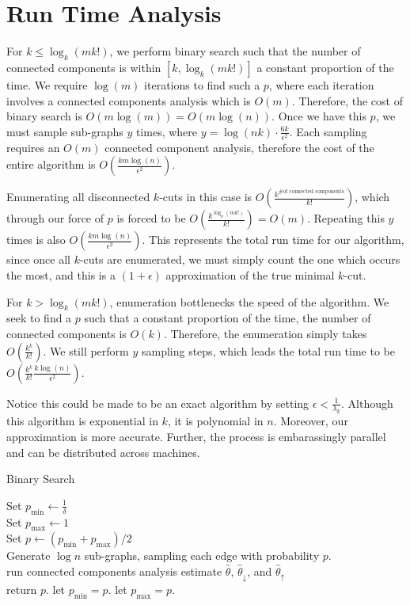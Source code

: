 \documentclass[12pt]{article}
\begin{document}
\section{Run Time Analysis}

For $k \leq \log_k(mk!)$, we perform binary search such that the number of connected components is within $[k, \log_k(mk!)]$ a constant proportion of the time. We require $\log(m)$ iterations to find such a $p$, where each iteration involves a connected components analysis which is $O(m)$. Therefore, the cost of binary search is $O(m \log(m)) = O(m \log(n))$. Once we have this $p$, we must sample sub-graphs $y$ times, where $y = \log(nk) \cdot \frac{6k}{\epsilon^2}$. Each sampling requires an $O(m)$ connected component analysis, therefore the cost of the entire algorithm is $O(\frac{km \log(n)}{\epsilon^2})$.

Enumerating all disconnected $k$-cuts in this case is $O(\frac{k^{\text{\# of connected components}}}{k!})$, which through our force of $p$ is forced to be $O(\frac{k^{\log_k(mk!)}}{k!}) = O(m)$. Repeating this $y$ times is also $O(\frac{km \log(n)}{\epsilon^2})$. This represents the total run time for our algorithm, since once all $k$-cuts are enumerated, we must simply count the one which occurs the most, and this is a $(1+\epsilon)$ approximation of the true minimal $k$-cut.

For $k > \log_k(mk!)$, enumeration bottlenecks the speed of the algorithm. We seek to find a $p$ such that a constant proportion of the time, the number of connected components is $O(k)$. Therefore, the enumeration simply takes $O(\frac{k^k}{k!})$. We still perform $y$ sampling steps, which leads the total run time to be $O(\frac{k^k}{k!} \frac{k \log(n)}{\epsilon^2})$.

Notice this could be made to be an exact algorithm by setting $\epsilon < \frac{1}{\lambda_k}$. Although this algorithm is exponential in $k$, it is polynomial in $n$. Moreover, our approximation is more accurate. Further, the process is embarassingly parallel and can be distributed across machines.

\LinesNumbered
\begin{algorithm}[H]
\caption{Binary Search}
Set $p_{\text{min}} \leftarrow \frac{1}{\delta}$ \\
Set $p_{\text{max}} \leftarrow 1$ \\
 {
  Set $p \leftarrow (p_{\text{min}} + p_{\text{max}})/2$ \\
  Generate $\log n$ sub-graphs, sampling each edge with probability   $p$. \\
   {
    run connected components analysis
  }
  estimate $\hat{\theta}$, $\hat{\theta}_{\downarrow}$, and $\hat{\theta}_{\uparrow}$ \\
   {
    return $p$.
  }
  \uElseIf{$\hat{\theta}_{\downarrow} > \hat{\theta}_{\uparrow}$} {
    let $p_{\text{min}} = p$.
  }
  \ElseIf{$\hat{\theta}_{\uparrow} > \hat{\theta}_{\downarrow}$} {
    let $p_{\text{max}} = p$.
  }
}
\end{algorithm}
\end{document}
